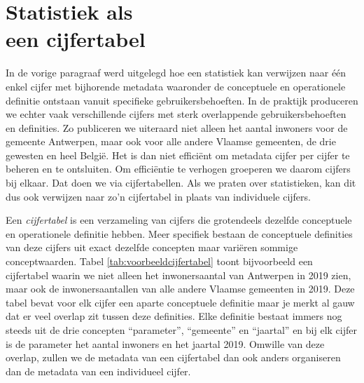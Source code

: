 \documentclass[\mainfiledir/00_handleiding_statistiekproductie.tex]{subfiles}
\begin{document}
	
	
	
	
	
	
	
	
	
	
	
	
	
	
	
	
	
	
	
	
	
	
	
	
	
	
	
	
	
	
	
	
	
	
\section[Statistiek als een cijfertabel]{Statistiek als\\een cijfertabel}


In de vorige paragraaf werd uitgelegd hoe een statistiek kan verwijzen naar één enkel cijfer met bijhorende metadata waaronder de conceptuele en operationele definitie ontstaan vanuit specifieke gebruikersbehoeften. In de praktijk produceren we echter vaak verschillende cijfers met sterk overlappende gebruikersbehoeften en definities. Zo publiceren we uiteraard niet alleen het aantal inwoners voor de gemeente Antwerpen, maar ook voor alle andere Vlaamse gemeenten, de drie gewesten en heel België. Het is dan niet efficiënt om metadata cijfer per cijfer te beheren en te ontsluiten. Om efficiëntie te verhogen groeperen we daarom cijfers bij elkaar. Dat doen we via cijfertabellen. Als we praten over statistieken, kan dit dus ook verwijzen naar zo'n cijfertabel in plaats van individuele cijfers.   

Een \emph{cijfertabel} is een verzameling van cijfers die grotendeels dezelfde conceptuele en operationele definitie hebben. Meer specifiek bestaan de conceptuele definities van deze cijfers uit exact dezelfde concepten maar variëren sommige conceptwaarden. Tabel \ref{tab:voorbeeldcijfertabel} toont bijvoorbeeld een cijfertabel waarin we niet alleen het inwonersaantal van Antwerpen in 2019 zien, maar ook de inwonersaantallen van alle andere Vlaamse gemeenten in 2019. Deze tabel bevat voor elk cijfer een aparte conceptuele definitie maar je merkt al gauw dat er veel overlap zit tussen deze definities. Elke definitie bestaat immers nog steeds uit de drie concepten ``parameter'', ``gemeente'' en ``jaartal'' en bij elk cijfer is de parameter het aantal inwoners en het jaartal 2019. Omwille van deze overlap, zullen we de metadata van een cijfertabel dan ook anders organiseren dan de metadata van een individueel cijfer. 
\end{document}
